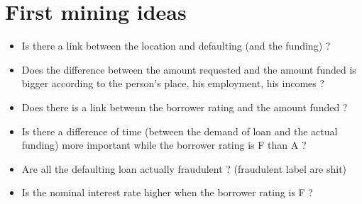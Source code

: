 \documentclass[a4paper,12pt]{article}
\begin{document}

	\section{First mining ideas}
		\begin{itemize}
			\item Is there a link between the location and defaulting (and the funding) ?
			\item Does the difference between the amount requested and the amount funded is bigger according to the person's place, his employment, his incomes ?
			\item Does there is a link betwenn the borrower rating and the amount funded ?
			\item Is there a difference of time (between the demand of loan and the actual funding) more important while the borrower rating is F than A ?
			\item Are all the defaulting loan actually fraudulent ? (fraudulent label are shit)
			\item Is the nominal interest rate higher when the borrower rating is F ?
		\end{itemize}
\end{document}
